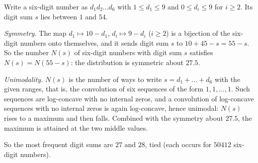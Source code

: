 Write a six-digit number as $d_1d_2\ldots d_6$ with $1\le d_1\le9$ and $0\le d_i\le9$ for $i\ge2$. Its digit sum $s$ lies between $1$ and $54$.

\emph{Symmetry.} The map $d_1\mapsto10-d_1$, $d_i\mapsto9-d_i$ ($i\ge2$) is a bijection of the six-digit numbers onto themselves, and it sends digit sum $s$ to $10+45-s=55-s$. So the number $N(s)$ of six-digit numbers with digit sum $s$ satisfies $N(s)=N(55-s)$: the distribution is symmetric about $27.5$.

\emph{Unimodality.} $N(s)$ is the number of ways to write $s=d_1+\dots+d_6$ with the given ranges, that is, the convolution of six sequences of the form $1,1,\dots,1$. Such sequences are log-concave with no internal zeros, and a convolution of log-concave sequences with no internal zeros is again log-concave, hence unimodal: $N(s)$ rises to a maximum and then falls. Combined with the symmetry about $27.5$, the maximum is attained at the two middle values.

So the most frequent digit sums are $\boxed{27\text{ and }28}$, tied (each occurs for $50412$ six-digit numbers).
